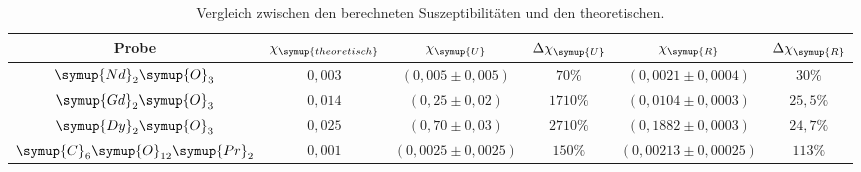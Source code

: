 \begin{table}[!htp]
\centering
\caption{Vergleich zwischen den berechneten Suszeptibilitäten und den theoretischen.}
\label{tab:vergleich}
\begin{tabular}{c c c c c c}
\toprule
{Probe} & {$\chi_{\symup{theoretisch}}$}& {$\chi_{\symup{U}}$} &{$\Delta \chi_{\symup{U}}$} & {$\chi_{\symup{R}}$} & {$\Delta \chi_{\symup{R}}$}  \\
\midrule
$\symup{Nd}_2\symup{O}_3$               & $0,003 $   &  $(0,005 \pm 0,005)$   & $70\%$   &  $(0,0021 \pm 0,0004)$   & $ 30\%$ \\
$\symup{Gd}_2\symup{O}_3$               & $0,014 $   &  $(0,25 \pm 0,02)$    & $1710\%$ &  $ (0,0104 \pm 0,0003)$  & $ 25,5\%$ \\
$\symup{Dy}_2\symup{O}_3$               & $0,025 $   &  $(0,70 \pm 0,03)$     & $2710\%$ &  $(0,1882 \pm 0,0003)$   & $ 24,7\%$ \\
$\symup{C}_6\symup{O}_{12}\symup{Pr}_2$ & $0,001 $   &  $(0,0025 \pm 0,0025)$ & $150\%$  &  $(0,00213 \pm 0,00025)$ & $ 113\%$ \\
\bottomrule
\end{tabular}
\end{table}